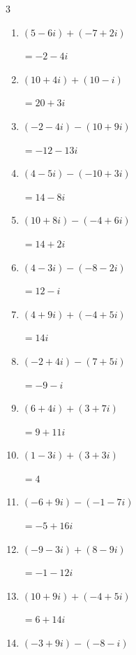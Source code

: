 \begin{multicols}{3}
\begin{enumerate}
  \item $\displaystyle (5-6i) + (-7+2i)$

        $\displaystyle =-2-4i$

  \item $\displaystyle (10+4i) + (10-i)$

        $\displaystyle =20+3i$

  \item $\displaystyle (-2-4i) - (10+9i)$

        $\displaystyle =-12-13i$

  \item $\displaystyle (4-5i) - (-10+3i)$

        $\displaystyle =14-8i$

  \item $\displaystyle (10+8i) - (-4+6i)$

        $\displaystyle =14+2i$

  \item $\displaystyle (4-3i) - (-8-2i)$

        $\displaystyle =12-i$

  \item $\displaystyle (4+9i) + (-4+5i)$

        $\displaystyle =14i$

  \item $\displaystyle (-2+4i) - (7+5i)$

        $\displaystyle =-9-i$

  \item $\displaystyle (6+4i) + (3+7i)$

        $\displaystyle =9+11i$

  \item $\displaystyle (1-3i) + (3+3i)$

        $\displaystyle =4$

  \item $\displaystyle (-6+9i) - (-1-7i)$

        $\displaystyle =-5+16i$

  \item $\displaystyle (-9-3i) + (8-9i)$

        $\displaystyle =-1-12i$

  \item $\displaystyle (10+9i) + (-4+5i)$

        $\displaystyle =6+14i$

  \item $\displaystyle (-3+9i) - (-8-i)$


\end{enumerate}
\end{multicols}
